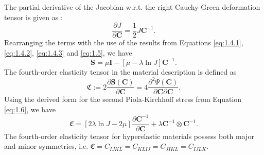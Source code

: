 \documentclass[11pt,a4paper,final]{article}
\begin{document}
The partial derivative of the Jacobian w.r.t. the right Cauchy-Green deformation tensor is given as \cite[see][page 46 Equation (3.124)]{Wriggers2008}:
\begin{equation}
\dfrac{\partial J}{\partial \mathbf{C}} = \dfrac{1}{2} J \mathbf{C}^{-1}.
\label{eq:1.5}
\end{equation}
Rearranging the terms with the use of the results from Equations \eqref{eq:1.4.1}, \eqref{eq:1.4.2}, \eqref{eq:1.4.3} and \eqref{eq:1.5}, we have
\begin{equation}
\mathbf{S} = \mu \mathbf{I} - \left[ \mu - \lambda \ln J \right] \mathbf{C}^{-1}.
\label{eq:1.6}
\end{equation}
The fourth-order elasticity tensor in the material description is defined as 
\begin{equation}
\mathfrak{C} := 2 \dfrac{\partial \mathbf{S}(\mathbf{C})}{\partial \mathbf{C}} = 4 \dfrac{\partial^2 \Psi (\mathbf{C})}{\partial \mathbf{C} \partial \mathbf{C}}.
\label{eq:1.6.2}
\end{equation}
Using the derived form for the second Piola-Kirchhoff stress from Equation \eqref{eq:1.6}, we have
\begin{equation}
\mathfrak{C} = \left[ 2 \lambda \ln J - 2 \mu \right]\dfrac{\partial \mathbf{C}^{-1}}{\partial \mathbf{C}} + \lambda \mathbf{C}^{-1} \otimes \mathbf{C}^{-1}.
\end{equation}
The fourth-order elasticity tensor for hyperelastic materials possess both major and minor symmetries, i.e. $\mathfrak{C} = C_{IJKL} = C_{KLIJ} = C_{JIKL} = C_{IJLK}$.
\end{document}

